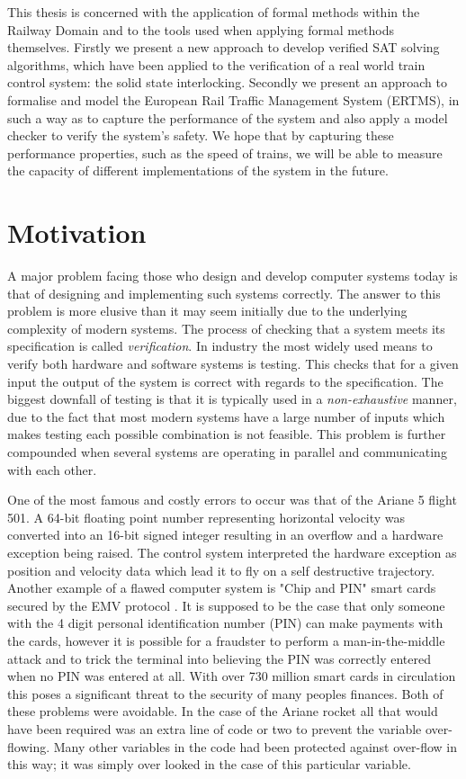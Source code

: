 
This thesis is concerned with the application of formal methods within the Railway Domain and to the tools used when applying formal methods themselves. Firstly we present a new approach to develop verified SAT solving algorithms, which have been applied to the verification of a real world train control system: the solid state interlocking. Secondly we present an approach to formalise and model the European Rail Traffic Management System (ERTMS), in such a way as to capture the performance of the system and also apply a model checker to verify the system's safety. We hope that by capturing these performance properties, such as the speed of trains, we will be able to measure the capacity of different implementations of the system in the future.

\section{Motivation}

A major problem facing those who design and develop computer systems today is  that of designing and implementing such systems correctly. The answer to this problem is more elusive than it may seem initially due to the underlying complexity of modern systems. The process of checking that a system meets its specification is called \emph{verification}. In industry the most widely used means to verify both hardware and software systems is testing. This checks that for a given input the output of the system is correct with regards to the specification. The biggest downfall of testing is that it is typically used in a \emph{non-exhaustive} manner, due to the fact that most modern systems have a large number of inputs which makes testing each possible combination is not feasible. This problem is further compounded when several systems are operating in parallel and communicating with each other.

One of the most famous and costly errors to occur was that of the Ariane 5 flight 501\cite{GL97}. A 64-bit floating point number representing horizontal velocity was converted into an 16-bit signed integer resulting in an overflow and a hardware exception being raised. The control system interpreted the hardware exception as position and velocity data which lead it to fly on a self destructive trajectory. Another example of a flawed computer system is "Chip and PIN" smart cards secured by the EMV protocol \cite{JM10}. It is supposed to be the case that only someone with the 4 digit personal identification number (PIN) can make payments with the cards, however it is possible for a fraudster to perform a man-in-the-middle attack and to trick the terminal into believing the PIN was correctly entered when no PIN was entered at all. With over 730 million smart cards in circulation this poses a significant threat to the security of many peoples finances. Both of these problems were avoidable. In the case of the Ariane rocket all that would have been required was an extra line of code or two to prevent the variable over-flowing. Many other variables in the code had been protected against over-flow in this way; it was simply over looked in the case of this particular variable.


